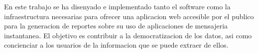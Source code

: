 
En este trabajo se ha disenyado e implementado tanto el software como la infraestructura necesarias para ofrecer una aplicacion web accesible por el publico para la generacion de reportes sobre su uso de aplicaciones de mensajeria instantanea. El objetivo es contribuir a la democratizacion de los datos, asi como concienciar a los usuarios de la informacion que se puede extraer de ellos.


